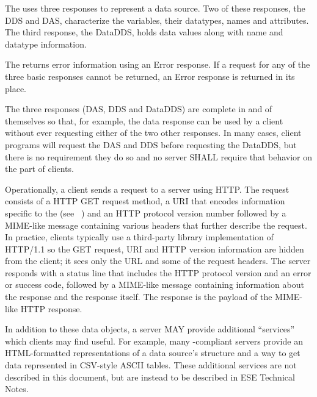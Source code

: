 \documentclass[justify]{nasa-ese}
\begin{document}
The \DAP uses three responses to represent a
data source. Two of these responses, the \ac{DDS} and
\ac{DAS}, characterize the variables, their datatypes, names and
attributes. The third response, the \ac{DataDDS}, holds
data values along with name and datatype information.

The \DAP returns error information using an Error response. If a request
for any of the three basic responses cannot be returned, an Error response is
returned in its place.

The three responses (\ac{DAS}, \ac{DDS}
and \ac{DataDDS}) are complete in and of themselves so that, for example, the
data response can be used by a client without ever requesting either of the
two other responses. In many cases, client programs will request the
\ac{DAS} and \ac{DDS} before requesting the \ac{DataDDS}, but there is no
requirement they do so and no server SHALL require that behavior on the part of
clients. 


Operationally, a \DAP client sends a request to a server using \ac{HTTP}. The
request consists of a \ac{HTTP} GET request method, a \ac{URI}\cite{rfc2396}
that encodes information specific to the \DAP (see
~) and an \ac{HTTP} protocol version number
followed by a MIME-like message containing various headers that further
describe the request. In practice, \DAP clients typically use a third-party
library implementation of \ac{HTTP}/1.1 so the GET request, \ac{URI} and
\ac{HTTP} version information are hidden from the client; it sees only the
\DAP \ac{URL} and some of the request headers. The \DAP server responds with
a status line that includes the \ac{HTTP} protocol version and an error or
success code, followed by a MIME-like message containing information about
the response and the response itself. The \DAP response is the payload of the
MIME-like \ac{HTTP} response.

In addition to these data objects, a \DAP server MAY provide additional
``services'' which clients may find useful. For example, many
\DAP-compliant servers provide an HTML-formatted representations of
a data source's structure and a way to get data represented in CSV-style ASCII
tables. These additional services are not described in this document, but are
instead to be described in ESE Technical Notes.
\end{document}

